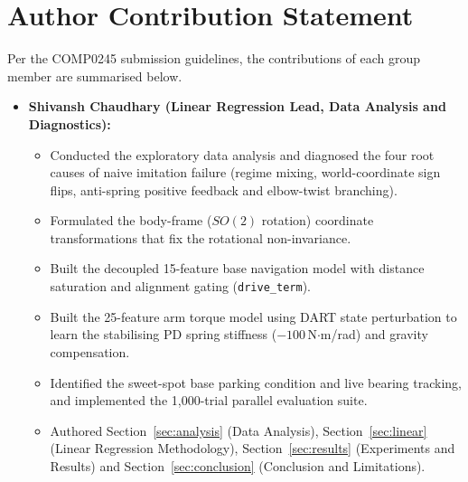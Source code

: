 \documentclass[conference]{IEEEtran}
\begin{document}
\clearpage
\onecolumn
\section*{Author Contribution Statement}

Per the COMP0245 submission guidelines, the contributions of each group member are summarised below.

\vspace{0.5cm}
\begin{itemize}
    \item \textbf{Shivansh Chaudhary (Linear Regression Lead, Data Analysis and Diagnostics):}
    \begin{itemize}
        \item Conducted the exploratory data analysis and diagnosed the four root causes of naive imitation failure (regime mixing, world-coordinate sign flips, anti-spring positive feedback and elbow-twist branching).
        \item Formulated the body-frame ($SO(2)$ rotation) coordinate transformations that fix the rotational non-invariance.
        \item Built the decoupled 15-feature base navigation model with distance saturation and alignment gating (\texttt{drive\_term}).
        \item Built the 25-feature arm torque model using DART state perturbation to learn the stabilising PD spring stiffness ($-100$\,N$\cdot$m/rad) and gravity compensation.
        \item Identified the sweet-spot base parking condition and live bearing tracking, and implemented the 1,000-trial parallel evaluation suite.
        \item Authored Section~\ref{sec:analysis} (Data Analysis), Section~\ref{sec:linear} (Linear Regression Methodology), Section~\ref{sec:results} (Experiments and Results) and Section~\ref{sec:conclusion} (Conclusion and Limitations).
    \end{itemize}


\end{itemize}
\end{document}
